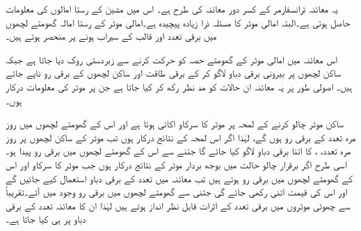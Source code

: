 یہ معائنہ ٹرانسفارمر کے کسر دور معائنہ کی طرح ہے۔ اس میں مشین کے رستا امالوں کی معلومات حاصل ہوتی ہے۔البتہ امالی موٹر کا مسئلہ ذرا زیادہ پیچیدہ ہے۔امالی موٹر کے رستا امالہ گھومتے لچھوں میں برقی تعدد اور قالب کے سیراب ہونے پر منحصر ہوتے ہیں۔

 اس معائنہ میں امالی موٹر کے گھومتے حصہ کو حرکت کرنے سے زبردستی روک دیا جاتا ہے جبکہ ساکن لچھوں پر بیرونی برقی دباو  لاگو کر کے برقی طاقت  اور ساکن لچھوں کے برقی رو  ناپے جاتے ہیں۔ اصولی طور پر یہ معائنہ ان حالات کو مد نظر رکھ کر کیا جاتا ہے جن پر موٹر کی معلومات درکار ہوں۔

ساکن موٹر چالو کرنے کے  لمحہ پر موٹر کا سرکاو اکائی ہوتا ہے اور اس کے گھومتے لچھوں میں  روز مرہ تعدد   کے برقی رو  ہوں گے، لہٰذا اگر اس لمحہ کے نتائج درکار ہوں تب موٹر کے ساکن لچھوں پر روز مرہ تعدد، ،   کا اتنا برقی دباو لاگو کیا جائے گا جتنے سے اس کے گھومتے لچھوں میں برقی رو  پیدا ہو۔ اسی طرح اگر برقرار چالو حالت میں بوجھ بردار موٹر کے نتائج درکار ہوں جب موٹر کا سرکاو  اور اس کے گھومتے لچھوں میں برقی رو  ہوتے ہیں تب معائنہ میں  تعدد کے برقی دباو استعمال کیے جائیں گے اور اس کی قیمت  اتنی رکھی جائے گی جتنی سے گھومتے لچھوں میں  برقی رو وجود میں آئے۔تقریباً   سے چھوٹی موٹروں میں برقی تعدد کے اثرات قابل نظر انداز ہوتے ہیں لہٰذا ان کا معائنہ  تعدد کے برقی دباو پر ہی کیا جاتا ہے۔


